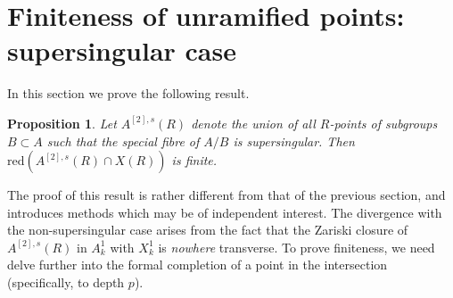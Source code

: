 \documentclass[11pt]{amsart}
\theoremstyle{plain}
\newtheorem{proposition}{Proposition}
\theoremstyle{definition}
\newcommand{\red}{\mathrm{red}}
\begin{document}

\section{Finiteness of unramified points: supersingular case}\label{sec:3}
In this section we prove the following result.
\begin{proposition}\label{prop:finites}
Let $A^{[2],s}(R)$ denote the union of all $R$-points of subgroups $B\subset A$ such that the special fibre of $A/B$ is supersingular. Then $\red (A^{[2],s}(R)\cap X(R))$ is finite.
\end{proposition}
The proof of this result is rather different from that of the previous section, and introduces methods which may be of independent interest. The divergence with the non-supersingular case arises from the fact that the Zariski closure of $A^{[2],s}(R)$ in $A_k ^1$ with $X_k ^1 $ is \textit{nowhere} transverse. To prove finiteness, we need delve further into the formal completion of a point in the intersection (specifically, to depth $p$).
\end{document}
